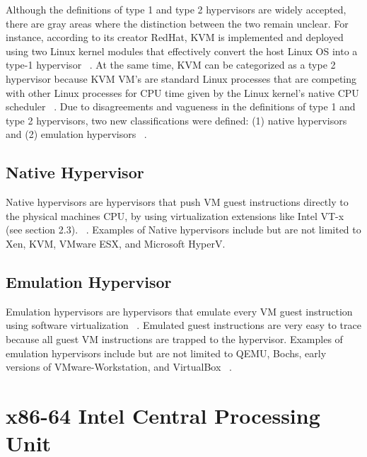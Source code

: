 \documentclass{report}
\begin{document}
\begin{spacing}{1.5}
{\large
Although the definitions of type 1 and type 2 hypervisors are widely accepted, there are gray areas where the distinction between the two remain unclear. For instance, according to its creator RedHat, KVM is implemented and deployed using two Linux kernel modules that effectively convert the host Linux OS into a type-1 hypervisor ~\cite{graziano2011performance}. At the same time, KVM can be categorized as a type 2 hypervisor because KVM VM's are standard Linux processes that are competing with other Linux processes for CPU time given by the Linux kernel's native CPU scheduler ~\cite{kvmcpuschedule}. Due to disagreements and vagueness in the definitions of type 1 and type 2 hypervisors, two new classifications were defined: (1) native hypervisors and (2) emulation hypervisors ~\cite{10.1145/2775111}.
}



\subsection{Native Hypervisor}

{\large
Native hypervisors are hypervisors that push VM guest instructions directly to the physical machines CPU, by using virtualization extensions like Intel VT-x (see section 2.3). ~\cite{10.1145/2775111}. Examples of Native hypervisors include but are not limited to Xen, KVM, VMware ESX, and Microsoft HyperV.
\newline
}


\subsection{Emulation Hypervisor}
{\large
Emulation hypervisors are hypervisors that emulate every VM guest instruction using software virtualization ~\cite{10.1145/2775111}. Emulated guest instructions are very easy to trace because all guest VM instructions are trapped to the hypervisor. Examples of emulation hypervisors include but are not limited to QEMU, Bochs, early versions of VMware-Workstation, and VirtualBox ~\cite{10.1145/2775111}.
\newline
}










\section{x86-64 Intel Central Processing Unit}



\end{spacing}
\end{document}
